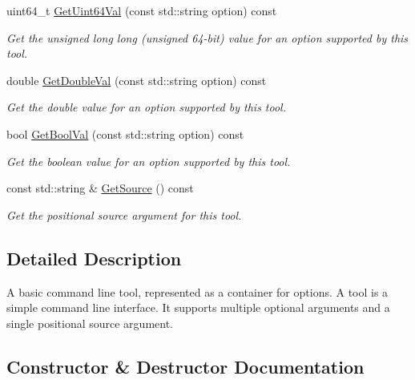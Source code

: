 \begin{DoxyCompactItemize}
uint64\+\_\+t \hyperlink{classtool_1_1Tool_a4acdbdd82d83e3fd95442582cb33aaa3}{Get\+Uint64\+Val} (const std\+::string option) const 
\begin{DoxyCompactList}\small\item\em Get the unsigned long long (unsigned 64-\/bit) value for an option supported by this tool. \end{DoxyCompactList}\item 
double \hyperlink{classtool_1_1Tool_aede929b4f49445c292023cfc38cf5132}{Get\+Double\+Val} (const std\+::string option) const 
\begin{DoxyCompactList}\small\item\em Get the double value for an option supported by this tool. \end{DoxyCompactList}\item 
bool \hyperlink{classtool_1_1Tool_aceeb31eea348ccd8f4b0a9e5e256fcb8}{Get\+Bool\+Val} (const std\+::string option) const 
\begin{DoxyCompactList}\small\item\em Get the boolean value for an option supported by this tool. \end{DoxyCompactList}\item 
const std\+::string \& \hyperlink{classtool_1_1Tool_ac9d3ac84a06d1e938238ed36d6aaf726}{Get\+Source} () const 
\begin{DoxyCompactList}\small\item\em Get the positional source argument for this tool. \end{DoxyCompactList}\end{DoxyCompactItemize}


\subsection{Detailed Description}
A basic command line tool, represented as a container for options. A tool is a simple command line interface. It supports multiple optional arguments and a single positional source argument. 

\subsection{Constructor \& Destructor Documentation}
